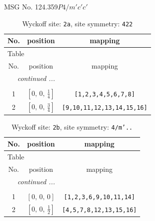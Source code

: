\documentclass[fleqn,8pt]{jsarticle}
\begin{document}
\setcounter{MaxMatrixCols}{32}

\renewcommand{\tablename}{Table~}
\renewcommand{\figurename}{Figure~}
\begin{center}
\LARGE
MSG No. 124.359\quad$P4/m'c'c'$
\end{center}
\renewcommand{\arraystretch}{1.2}
\begin{longtable}{ccc}
\caption{Wyckoff site: {\tt 2a}, site symmetry: {\tt 422}}
 \\
 \hline \hline
No. & position & mapping \\ \hline \endfirsthead

\multicolumn{2}{l}{\tablename\ \thetable{}} \\
 \hline \hline
No. & position & mapping \\ \hline \endhead

 \hline \hline
\multicolumn{2}{r}{\footnotesize\it continued ...} \\ \endfoot

 \hline \hline
\multicolumn{2}{r}{} \\ \endlastfoot

1 & $\left[ 0,\, 0,\, \frac{1}{4} \right]$ & {\tt [1,2,3,4,5,6,7,8]} \\ \hline
2 & $\left[ 0,\, 0,\, \frac{3}{4} \right]$ & {\tt [9,10,11,12,13,14,15,16]} \\
\end{longtable}
\renewcommand{\arraystretch}{1.2}
\begin{longtable}{ccc}
\caption{Wyckoff site: {\tt 2b}, site symmetry: {\tt 4/m'..}}
 \\
 \hline \hline
No. & position & mapping \\ \hline \endfirsthead

\multicolumn{2}{l}{\tablename\ \thetable{}} \\
 \hline \hline
No. & position & mapping \\ \hline \endhead

 \hline \hline
\multicolumn{2}{r}{\footnotesize\it continued ...} \\ \endfoot

 \hline \hline
\multicolumn{2}{r}{} \\ \endlastfoot

1 & $\left[ 0,\, 0,\, 0 \right]$ & {\tt [1,2,3,6,9,10,11,14]} \\ \hline
2 & $\left[ 0,\, 0,\, \frac{1}{2} \right]$ & {\tt [4,5,7,8,12,13,15,16]} \\
\end{longtable}
\end{document}
